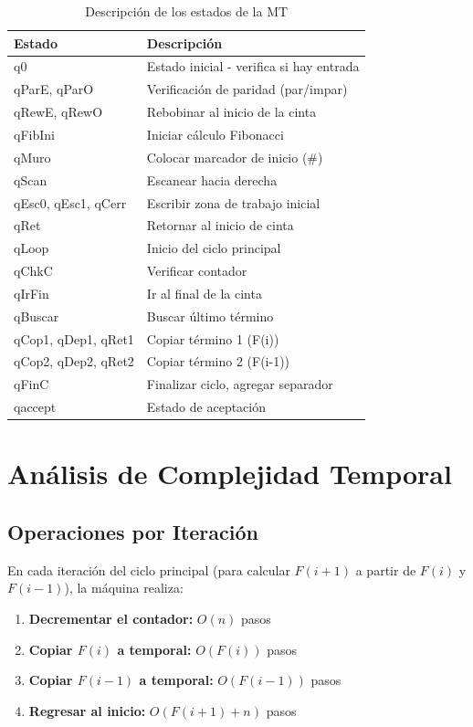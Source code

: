 \documentclass[12pt,a4paper]{article}
\begin{document}
\begin{table}[H]
\centering
\small
\begin{tabular}{lp{10cm}}
\toprule
\textbf{Estado} & \textbf{Descripción} \\
\midrule
q0 & Estado inicial - verifica si hay entrada \\
qParE, qParO & Verificación de paridad (par/impar) \\
qRewE, qRewO & Rebobinar al inicio de la cinta \\
qFibIni & Iniciar cálculo Fibonacci \\
qMuro & Colocar marcador de inicio (\#) \\
qScan & Escanear hacia derecha \\
qEsc0, qEsc1, qCerr & Escribir zona de trabajo inicial \\
qRet & Retornar al inicio de cinta \\
qLoop & Inicio del ciclo principal \\
qChkC & Verificar contador \\
qIrFin & Ir al final de la cinta \\
qBuscar & Buscar último término \\
qCop1, qDep1, qRet1 & Copiar término 1 (F(i)) \\
qCop2, qDep2, qRet2 & Copiar término 2 (F(i-1)) \\
qFinC & Finalizar ciclo, agregar separador \\
qaccept & Estado de aceptación \\
\bottomrule
\end{tabular}
\caption{Descripción de los estados de la MT}
\end{table}

\newpage

\section{Análisis de Complejidad Temporal}

\subsection{Operaciones por Iteración}

En cada iteración del ciclo principal (para calcular $F(i+1)$ a partir de $F(i)$ y $F(i-1)$), la máquina realiza:

\begin{enumerate}
    \item \textbf{Decrementar el contador:} $O(n)$ pasos
    \item \textbf{Copiar $F(i)$ a temporal:} $O(F(i))$ pasos
    \item \textbf{Copiar $F(i-1)$ a temporal:} $O(F(i-1))$ pasos
    \item \textbf{Regresar al inicio:} $O(F(i+1) + n)$ pasos
\end{enumerate}
\end{document}
